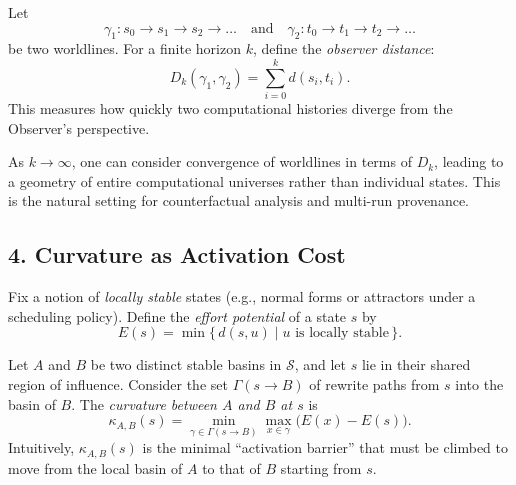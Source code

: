 \begin{definition}
Let
\[
\gamma_1: s_0 \to s_1 \to s_2 \to \dots
\quad\text{and}\quad
\gamma_2: t_0 \to t_1 \to t_2 \to \dots
\]
be two worldlines. For a finite horizon $k$, define the \emph{observer distance}:
\[
D_k(\gamma_1, \gamma_2) = \sum_{i=0}^{k} d(s_i, t_i).
\]
This measures how quickly two computational histories diverge from the Observer's perspective.
\end{definition}

\begin{remark}
As $k \to \infty$, one can consider convergence of worldlines in terms of $D_k$, leading to a geometry of entire computational universes rather than individual states. This is the natural setting for counterfactual analysis and multi-run provenance.
\end{remark}

\subsection*{4. Curvature as Activation Cost}

\begin{definition}
Fix a notion of \emph{locally stable} states (e.g., normal forms or attractors under a scheduling policy). Define the \emph{effort potential} of a state $s$ by
\[
E(s) = \min \{\, d(s, u) \mid u \text{ is locally stable} \,\}.
\]
\end{definition}

\begin{definition}
Let $A$ and $B$ be two distinct stable basins in $\mathcal{S}$, and let $s$ lie in their shared region of influence. Consider the set $\Gamma(s \to B)$ of rewrite paths from $s$ into the basin of $B$. The \emph{curvature between $A$ and $B$ at $s$} is
\[
\kappa_{A,B}(s)
= \min_{\gamma \in \Gamma(s \to B)} \max_{x \in \gamma} \bigl(E(x) - E(s)\bigr).
\]
Intuitively, $\kappa_{A,B}(s)$ is the minimal ``activation barrier'' that must be climbed to move from the local basin of $A$ to that of $B$ starting from $s$.
\end{definition}

